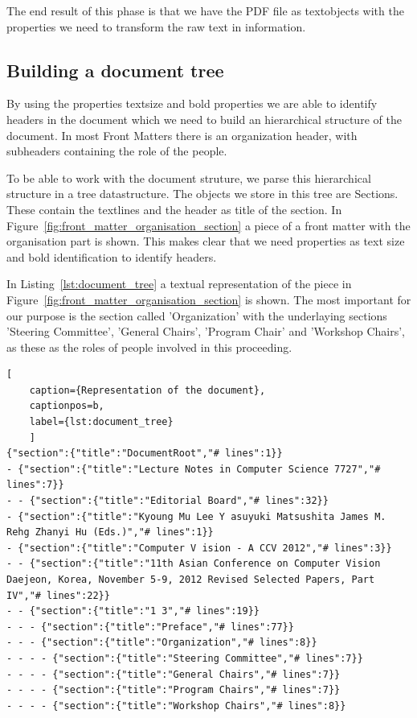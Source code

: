 \documentclass{ou-report}
\begin{document}
The end result of this phase is that we have the PDF file as textobjects with 
the properties we need to transform the raw text in information.

\subsection{Building a document tree}
\label{sec:lncs_parser_doc_tree}
By using the properties textsize and bold properties we are able to identify
headers in the document which we need to build an hierarchical structure of the
document. In 
most Front Matters there is an organization header, with subheaders containing 
the role of the people.

To be able to work with the document struture, we parse this hierarchical
structure in a tree datastructure.
The objects we store in this tree are Sections. These contain the 
textlines and the header as title of the section. 
In Figure~\ref{fig:front_matter_organisation_section} a piece of a front matter
with the organisation part is shown. This makes clear that we need properties as
text size and bold identification to identify headers. 



In
Listing~\ref{lst:document_tree} a textual representation of the piece in
Figure~\ref{fig:front_matter_organisation_section} is shown.
The most important for our purpose is the section called 'Organization' with
the underlaying sections 'Steering Committee', 'General Chairs', 'Program Chair'
and 'Workshop Chairs', as these as the roles of people involved in this
proceeding.

\begin{lstlisting}[
    caption={Representation of the document},
    captionpos=b,
    label={lst:document_tree}
    ]
{"section":{"title":"DocumentRoot","# lines":1}}
- {"section":{"title":"Lecture Notes in Computer Science 7727","# lines":7}}
- - {"section":{"title":"Editorial Board","# lines":32}}
- {"section":{"title":"Kyoung Mu Lee Y asuyuki Matsushita James M. Rehg Zhanyi Hu (Eds.)","# lines":1}}
- {"section":{"title":"Computer V ision - A CCV 2012","# lines":3}}
- - {"section":{"title":"11th Asian Conference on Computer Vision Daejeon, Korea, November 5-9, 2012 Revised Selected Papers, Part IV","# lines":22}}
- - {"section":{"title":"1 3","# lines":19}}
- - - {"section":{"title":"Preface","# lines":77}}
- - - {"section":{"title":"Organization","# lines":8}}
- - - - {"section":{"title":"Steering Committee","# lines":7}}
- - - - {"section":{"title":"General Chairs","# lines":7}}
- - - - {"section":{"title":"Program Chairs","# lines":7}}
- - - - {"section":{"title":"Workshop Chairs","# lines":8}}
\end{lstlisting}
\end{document}
